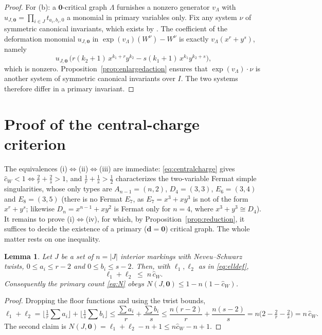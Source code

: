 \documentclass[11pt]{amsart}
\newtheorem{lemma}[theorem]{Lemma}
\theoremstyle{definition}
\theoremstyle{remark}
\newcommand{\chat}{\hat{c}}
\begin{document}
\begin{proof}
For (b): a $\mathbf 0$-critical graph $\Lambda$ furnishes a nonzero generator
$v_{\Lambda}$ with $u_{J,\mathbf 0}=\prod_{i\in J}t_{a_{i},b_{i},0}$ a monomial
in primary variables only. Fix any system
$\nu$ of symmetric canonical invariants, which exists by
\cite[Theorem~0.1]{GKT}. The coefficient of the deformation monomial
$u_{J,\mathbf0}$ in
$\exp(v_{\Lambda})(W^{\nu})-W^{\nu}$ is exactly
$v_{\Lambda}(x^{r}+y^{s})$, namely
\[
u_{J,\mathbf 0}\,\bigl(r(k_{2}+1)\,x^{k_{1}+r}y^{k_{2}}
-s(k_{1}+1)\,x^{k_{1}}y^{k_{2}+s}\bigr),
\]
which is nonzero. Proposition~\ref{prop:enlargedaction} ensures that
$\exp(v_{\Lambda})\cdot\nu$ is another system of symmetric canonical invariants
over $I$. The two systems therefore differ in a primary
invariant.
\end{proof}

\section{Proof of the central-charge criterion}
\label{sec:proof}

The equivalences (i)$\Leftrightarrow$(ii)$\Leftrightarrow$(iii) are immediate:
\eqref{eq:centralcharge} gives $\chat_{W}<1\Leftrightarrow\frac2r+\frac2s>1$, and
$\frac1r+\frac1s>\frac12$ characterizes the two-variable Fermat simple
singularities, whose only types are $A_{n-1}=(n,2)$, $D_{4}=(3,3)$,
$E_{6}=(3,4)$ and $E_{8}=(3,5)$ (there is no Fermat $E_{7}$, as $E_{7}=x^{3}+xy^{3}$
is not of the form $x^{r}+y^{s}$; likewise $D_{n}=x^{n-1}+xy^{2}$ is Fermat only
for $n=4$, where $x^{3}+y^{3}\cong D_{4}$). It remains to prove
(i)$\Leftrightarrow$(iv), for which, by Proposition~\ref{prop:reduction}, it
suffices to decide the existence of a primary ($\mathbf d=\mathbf0$) critical
graph. The whole matter rests on one inequality.

\begin{lemma}
\label{lem:bound}
Let $J$ be a set of $n=|J|$ interior markings with Neveu--Schwarz twists,
$0\leq a_{i}\leq r-2$ and $0\leq b_{i}\leq s-2$. Then, with $\ell_{1},\ell_{2}$
as in \eqref{eq:elldef},
\[
\ell_{1}+\ell_{2}\;\leq\;n\,\chat_{W}.
\]
Consequently the primary count \eqref{eq:N} obeys
$N(J,\mathbf 0)\leq 1-n(1-\chat_{W})$.
\end{lemma}

\begin{proof}
Dropping the floor functions and using the twist bounds,
\[
\ell_{1}+\ell_{2}
=\Big\lfloor\tfrac1r\textstyle\sum a_{i}\Big\rfloor
+\Big\lfloor\tfrac1s\textstyle\sum b_{i}\Big\rfloor
\leq\frac{\sum a_{i}}{r}+\frac{\sum b_{i}}{s}
\leq\frac{n(r-2)}{r}+\frac{n(s-2)}{s}
=n\Big(2-\tfrac2r-\tfrac2s\Big)=n\,\chat_{W}.
\]
The second claim is $N(J,\mathbf 0)=\ell_{1}+\ell_{2}-n+1\leq n\chat_{W}-n+1$.
\end{proof}
\end{document}
